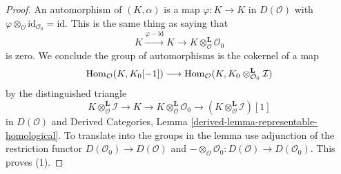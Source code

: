 \begin{proof}
An automorphism of $(K, \alpha)$ is a map $\varphi : K \to K$
in $D(\mathcal{O})$ with
$\varphi \otimes_\mathcal{O} \text{id}_{\mathcal{O}_0} = \text{id}$.
This is the same thing as saying that
$$
K \xrightarrow{\varphi - \text{id}} K \to
K \otimes_\mathcal{O}^\mathbf{L} \mathcal{O}_0
$$
is zero. We conclude the group of automorphisms is
the cokernel of a map
$$
\mathop{\mathrm{Hom}}\nolimits_\mathcal{O}(K, K_0[-1])
\longrightarrow
\mathop{\mathrm{Hom}}\nolimits_\mathcal{O}(K, K_0 \otimes_{\mathcal{O}_0}^\mathbf{L} \mathcal{I})
$$
by the distinguished triangle
$$
K \otimes_\mathcal{O}^\mathbf{L} \mathcal{I} \to
K \to
K \otimes_\mathcal{O}^\mathbf{L} \mathcal{O}_0 \to
(K \otimes_\mathcal{O}^\mathbf{L} \mathcal{I})[1]
$$
in $D(\mathcal{O})$ and 
Derived Categories, Lemma \ref{derived-lemma-representable-homological}.
To translate into the groups in the lemma use adjunction
of the restriction functor $D(\mathcal{O}_0) \to D(\mathcal{O})$ and
$- \otimes_\mathcal{O} \mathcal{O}_0 : D(\mathcal{O}) \to D(\mathcal{O}_0)$.
This proves (1).


\end{proof}

